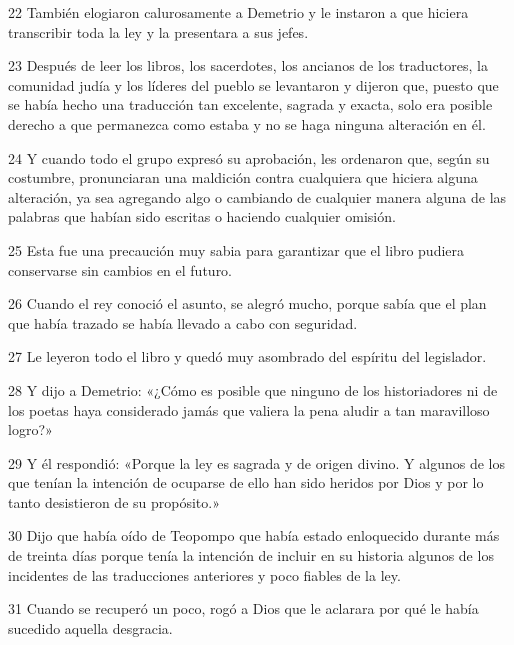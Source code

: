 \par 22 También elogiaron calurosamente a Demetrio y le instaron a que hiciera transcribir toda la ley y la presentara a sus jefes.

\par 23 Después de leer los libros, los sacerdotes, los ancianos de los traductores, la comunidad judía y los líderes del pueblo se levantaron y dijeron que, puesto que se había hecho una traducción tan excelente, sagrada y exacta, solo era posible derecho a que permanezca como estaba y no se haga ninguna alteración en él.

\par 24 Y cuando todo el grupo expresó su aprobación, les ordenaron que, según su costumbre, pronunciaran una maldición contra cualquiera que hiciera alguna alteración, ya sea agregando algo o cambiando de cualquier manera alguna de las palabras que habían sido escritas o haciendo cualquier omisión.

\par 25 Esta fue una precaución muy sabia para garantizar que el libro pudiera conservarse sin cambios en el futuro.

\par 26 Cuando el rey conoció el asunto, se alegró mucho, porque sabía que el plan que había trazado se había llevado a cabo con seguridad.

\par 27 Le leyeron todo el libro y quedó muy asombrado del espíritu del legislador.

\par 28 Y dijo a Demetrio: «¿Cómo es posible que ninguno de los historiadores ni de los poetas haya considerado jamás que valiera la pena aludir a tan maravilloso logro?»

\par 29 Y él respondió: «Porque la ley es sagrada y de origen divino. Y algunos de los que tenían la intención de ocuparse de ello han sido heridos por Dios y por lo tanto desistieron de su propósito.»

\par 30 Dijo que había oído de Teopompo que había estado enloquecido durante más de treinta días porque tenía la intención de incluir en su historia algunos de los incidentes de las traducciones anteriores y poco fiables de la ley.

\par 31 Cuando se recuperó un poco, rogó a Dios que le aclarara por qué le había sucedido aquella desgracia.

